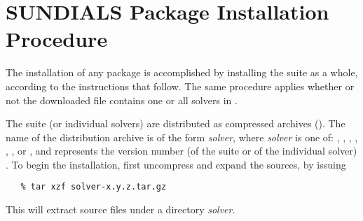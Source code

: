 \chapter{SUNDIALS Package Installation Procedure}\label{c:install}

The installation of any {\sundials} package is accomplished by installing the
{\sundials} suite as a whole, according to the instructions that
follow. The same procedure applies whether or not the downloaded
file contains one or all solvers in {\sundials}.

The {\sundials} suite (or individual solvers) are distributed as
compressed archives (). The name of the distribution
archive is of the form {\em solver}, where {\em solver}
is one of: , , , , ,
, or , and  represents the version number
(of the {\sundials} suite or of the individual solver)
.
To begin the installation, first uncompress and expand the sources, by issuing
\begin{verbatim}
   % tar xzf solver-x.y.z.tar.gz
\end{verbatim}
This will extract source files under a directory {\em solver}.

